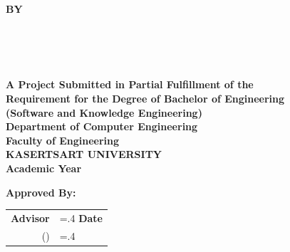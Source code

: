 \thispagestyle{empty}
\begin{center}
    {\huge\textbf{\usevar{\srsTitle}}}\vspace{1in}

    {\huge\textbf{BY}}\vspace{.5in}

    {\huge\textbf{%
        \usevar{\srsAuthorOne} \\
        \usevar{\srsAuthorTwo} \\
        \usevar{\srsAuthorThree} \\
    }}\vfill

    {\large\textbf{%
        A Project Submitted in Partial Fulfillment of the\\
        Requirement for the Degree of Bachelor of Engineering\\
        (Software and Knowledge Engineering)\\
        Department of Computer Engineering\\
        Faculty of Engineering\\
        KASERTSART UNIVERSITY\\
        Academic Year \usevar{\srsAcademicYear}\\
    }}
\end{center}

\vspace{.5in}

{\large\textbf{Approved By:}}\vspace{.2in}

\begin{tabularx}{1\textwidth}{X >{\hsize=.4\hsize}X}
    \textbf{Advisor}\dotfill & \textbf{Date}\dotfill \\
    \multicolumn{1}{r}{(\usevar{\srsAdvisorName})} & \\[.1in]


\end{tabularx}

\restoregeometry